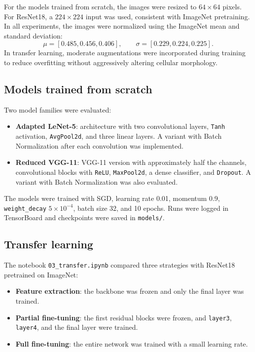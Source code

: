 \documentclass[11pt,a4paper]{article}
\begin{document}
For the models trained from scratch, the images were resized to $64 \times 64$ pixels. For ResNet18, a $224 \times 224$ input was used, consistent with ImageNet pretraining. In all experiments, the images were normalized using the ImageNet mean and standard deviation:
\[
\mu = [0.485, 0.456, 0.406], \qquad \sigma = [0.229, 0.224, 0.225].
\]
In transfer learning, moderate augmentations were incorporated during training to reduce overfitting without aggressively altering cellular morphology.

\subsection{Models trained from scratch}

Two model families were evaluated:

\begin{itemize}
    \item \textbf{Adapted LeNet-5}: architecture with two convolutional layers, \texttt{Tanh} activation, \texttt{AvgPool2d}, and three linear layers. A variant with Batch Normalization after each convolution was implemented.
    \item \textbf{Reduced VGG-11}: VGG-11 version with approximately half the channels, convolutional blocks with \texttt{ReLU}, \texttt{MaxPool2d}, a dense classifier, and \texttt{Dropout}. A variant with Batch Normalization was also evaluated.
\end{itemize}

The models were trained with SGD, learning rate 0.01, momentum 0.9, \texttt{weight\_decay} $5 \times 10^{-4}$, batch size 32, and 10 epochs. Runs were logged in TensorBoard and checkpoints were saved in \texttt{models/}.

\subsection{Transfer learning}

The notebook \texttt{03\_transfer.ipynb} compared three strategies with ResNet18 pretrained on ImageNet:

\begin{itemize}
    \item \textbf{Feature extraction}: the backbone was frozen and only the final layer was trained.
    \item \textbf{Partial fine-tuning}: the first residual blocks were frozen, and \texttt{layer3}, \texttt{layer4}, and the final layer were trained.
    \item \textbf{Full fine-tuning}: the entire network was trained with a small learning rate.
\end{itemize}
\end{document}

